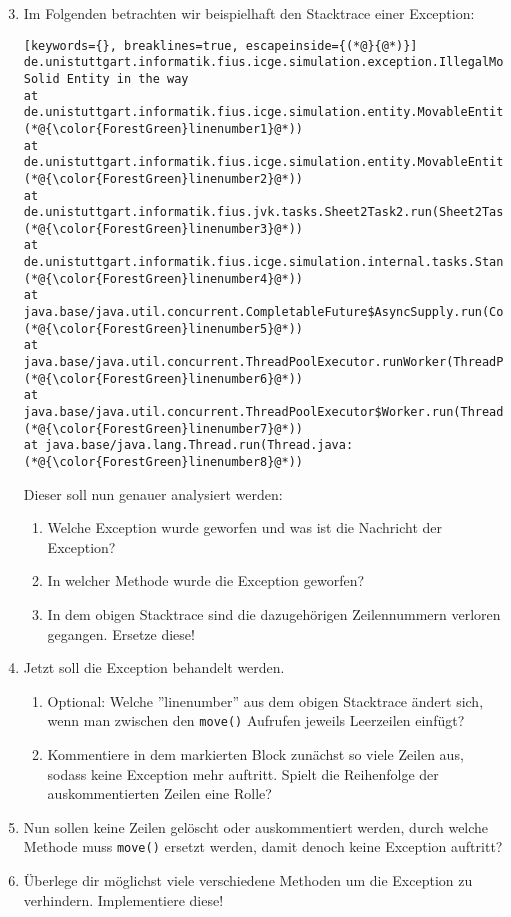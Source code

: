 \begin{enumerate}[label=\alph*)] \setcounter{enumi}{2}
    \item Im Folgenden betrachten wir beispielhaft den Stacktrace einer Exception:
    \begin{lstlisting}[keywords={}, breaklines=true, escapeinside={(*@}{@*)}]
de.unistuttgart.informatik.fius.icge.simulation.exception.IllegalMoveException: Solid Entity in the way
at de.unistuttgart.informatik.fius.icge.simulation.entity.MovableEntity.internalMove(MovableEntity.java:(*@{\color{ForestGreen}linenumber1}@*))
at de.unistuttgart.informatik.fius.icge.simulation.entity.MovableEntity.move(MovableEntity.java:(*@{\color{ForestGreen}linenumber2}@*))
at de.unistuttgart.informatik.fius.jvk.tasks.Sheet2Task2.run(Sheet2Task2.java:(*@{\color{ForestGreen}linenumber3}@*))
at de.unistuttgart.informatik.fius.icge.simulation.internal.tasks.StandardTaskRunner.executeTask(StandardTaskRunner.java:(*@{\color{ForestGreen}linenumber4}@*))
at java.base/java.util.concurrent.CompletableFuture$AsyncSupply.run(CompletableFuture.java:(*@{\color{ForestGreen}linenumber5}@*))
at java.base/java.util.concurrent.ThreadPoolExecutor.runWorker(ThreadPoolExecutor.java:(*@{\color{ForestGreen}linenumber6}@*))
at java.base/java.util.concurrent.ThreadPoolExecutor$Worker.run(ThreadPoolExecutor.java:(*@{\color{ForestGreen}linenumber7}@*))
at java.base/java.lang.Thread.run(Thread.java:(*@{\color{ForestGreen}linenumber8}@*))
    \end{lstlisting}
    Dieser soll nun genauer analysiert werden:
    \begin{enumerate}
        \item[i)] Welche Exception wurde geworfen und was ist die Nachricht der Exception?
        \item[ii)] In welcher Methode wurde die Exception geworfen?
        \item[iii)] In dem obigen Stacktrace sind die dazugehörigen Zeilennummern verloren gegangen. Ersetze diese!  
    \end{enumerate}
    \item Jetzt soll die Exception behandelt werden.
    \begin{enumerate}
        \item[i)] Optional: Welche ''linenumber'' aus dem obigen Stacktrace ändert sich, wenn man zwischen den \lstinline{move()} Aufrufen jeweils
        Leerzeilen einfügt?  
        \item[ii)] Kommentiere in dem markierten Block zunächst so viele Zeilen aus, sodass keine Exception mehr auftritt. 
        Spielt die Reihenfolge der auskommentierten Zeilen eine Rolle?
    \end{enumerate}
    \item  Nun sollen keine Zeilen gelöscht oder auskommentiert werden, durch welche Methode muss \lstinline{move()} ersetzt werden, damit 
    denoch keine Exception auftritt?
    \item Überlege dir möglichst viele verschiedene Methoden um die Exception zu verhindern. Implementiere diese!
\end{enumerate}
 
